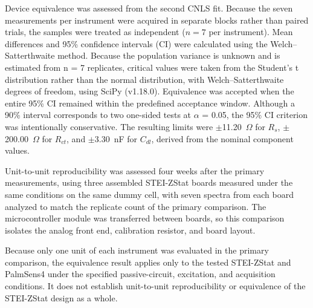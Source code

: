 Device equivalence was assessed from the second CNLS fit. Because the seven measurements per instrument were acquired in separate blocks rather than paired trials, the samples were treated as independent ($n = 7$ per instrument). Mean differences and 95\% confidence intervals (CI) were calculated using the Welch--Satterthwaite method. Because the population variance is unknown and is estimated from n = 7 replicates, critical values were taken from the Student's t distribution rather than the normal distribution, with Welch--Satterthwaite degrees of freedom, using SciPy (v1.18.0). Equivalence was accepted when the entire 95\% CI remained within the predefined acceptance window. Although a 90\% interval corresponds to two one-sided tests at $\alpha$ = 0.05, the 95\% CI criterion was intentionally conservative. The resulting limits were $\pm$11.20~$\Omega$ for $R_s$, $\pm$200.00~$\Omega$ for $R_{ct}$, and $\pm$3.30~nF for $C_{dl}$, derived from the nominal component values.

Unit-to-unit reproducibility was assessed four weeks after the primary measurements, using three assembled STEI-ZStat boards measured under the same conditions on the same dummy cell, with seven spectra from each board analyzed to match the replicate count of the primary comparison. The microcontroller module was transferred between boards, so this comparison isolates the analog front end, calibration resistor, and board layout.

Because only one unit of each instrument was evaluated in the primary comparison, the equivalence result applies only to the tested STEI-ZStat and PalmSens4 under the specified passive-circuit, excitation, and acquisition conditions. It does not establish unit-to-unit reproducibility or equivalence of the STEI-ZStat design as a whole.

